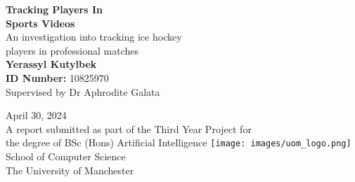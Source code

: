 \documentclass[12pt, letterpaper]{article}
\begin{document}
\begin{center}
    \Huge\textbf{Tracking Players In \\ Sports Videos} \\[12pt]
    \Large{An investigation into tracking ice hockey \\ players in professional matches} \\[55pt]
    \huge\textbf{Yerassyl Kutylbek} \\[6pt]
    \Large\textbf{ID Number:} {10825970} \\[5pt]
    \Large{Supervised by Dr Aphrodite Galata} \\[5pt]
    \date\Large{April 30, 2024} \\[90pt]

    \large{A report submitted as part of the Third Year Project for} \\[3pt]
    \large{the degree of BSc (Hons) Artificial Intelligence}
    \centering
    \texttt{[image: images/uom\_logo.png]} \\
    \large{School of Computer Science} \\[5pt]
    \large{The University of Manchester}
\end{center}

\tableofcontents
\newpage

\hypertarget{listoftables}{}
\listoftables
\newpage

\hypertarget{listoffigures}{}
\listoffigures
\newpage

\end{document}
